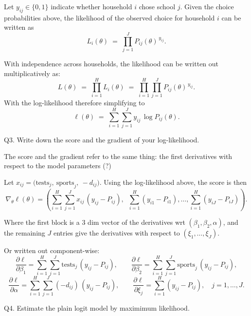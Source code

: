 \documentclass{article}
\begin{document}
Let $y_{ij}\in\{0,1\}$ indicate whether household $i$ chose school $j$.
Given the choice probabilities above, the likelihood of the observed choice for household $i$ can be written as
\[
L_i(\theta) \;=\; \prod_{j=1}^J P_{ij}(\theta)^{\,y_{ij}}.
\]

With independence across households, the likelihood can be written out multiplicatively as:
\[
L(\theta) \;=\; \prod_{i=1}^H L_i(\theta) 
\;=\; \prod_{i=1}^H \prod_{j=1}^J P_{ij}(\theta)^{\,y_{ij}}.
\]
With the log-likelihood therefore simplifying to
\[
\ell(\theta) 
\;=\; \sum_{i=1}^H \sum_{j=1}^J y_{ij}\,\log P_{ij}(\theta).
\]




\begin{tcolorbox}
Q3. Write down the score and the gradient of your log-likelihood.
\end{tcolorbox}

The score and the gradient refer to the same thing: the first derivatives with respect to the model parameters (?)

\vspace{5mm}

Let $x_{ij} = \big(\text{tests}_j,\ \text{sports}_j,\ -d_{ij}\big)$. Using the log-likelihood above, the score is then
\[
\nabla_\theta \ell(\theta)
=
\left(
\sum_{i=1}^H \sum_{j=1}^J x_{ij}\,(y_{ij}-P_{ij}),
\;\;
\sum_{i=1}^H (y_{i1}-P_{i1}),
\ldots,
\sum_{i=1}^H (y_{iJ}-P_{iJ})
\right).
\]

Where the first block is a 3 dim vector of the derivatives wrt $(\beta_1,\beta_2,\alpha)$, and the remaining $J$ entries give the derivatives with respect to $(\xi_1,\ldots,\xi_J)$.

Or written out component-wise:
\[
\frac{\partial \ell}{\partial \beta_1}
=\sum_{i=1}^H\sum_{j=1}^J \text{tests}_j\,(y_{ij}-P_{ij}), 
\qquad
\frac{\partial \ell}{\partial \beta_2}
=\sum_{i=1}^H\sum_{j=1}^J \text{sports}_j\,(y_{ij}-P_{ij}),
\]
\[
\frac{\partial \ell}{\partial \alpha}
=\sum_{i=1}^H\sum_{j=1}^J (-d_{ij})\,(y_{ij}-P_{ij}),
\qquad
\frac{\partial \ell}{\partial \xi_j}
=\sum_{i=1}^H (y_{ij}-P_{ij}), \quad j=1,\ldots,J.
\]

\begin{tcolorbox}
Q4. Estimate the plain logit model by maximimum likelihood.
\end{tcolorbox}

\begin{table}[H]
\centering
{}
\caption{Estimation results for logit models.}
\end{table}
\end{document}

